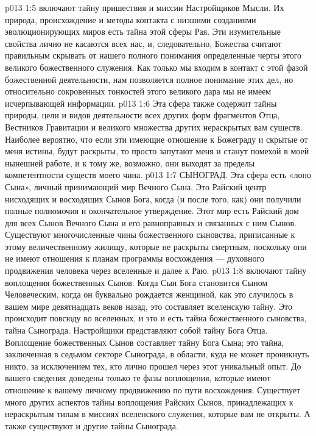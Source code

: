 \vs p013 1:5 \pc {} включают тайну пришествия и миссии Настройщиков Мысли. Их природа, происхождение и методы контакта с низшими созданиями эволюционирующих миров есть тайна этой сферы Рая. Эти изумительные свойства лично не касаются всех нас, и, следовательно, Божества считают правильным скрывать от нашего полного понимания определенные черты этого великого божественного служения. Как только мы входим в контакт с этой фазой божественной деятельности, нам позволяется полное понимание этих дел, но относительно сокровенных тонкостей этого великого дара мы не имеем исчерпывающей информации.
\vs p013 1:6 Эта сфера также содержит тайны природы, цели и видов деятельности всех других форм фрагментов Отца, Вестников Гравитации и великого множества других нераскрытых вам существ. Наиболее вероятно, что если эти имеющие отношение к Божеграду и скрытые от меня истины, будут раскрыты, то просто запутают меня и станут помехой в моей нынешней работе, и к тому же, возможно, они выходят за пределы компетентности существ моего чина.
\vs p013 1:7 \bibnobreakspace СЫНОГРАД. Эта сфера есть «лоно Сына», личный принимающий мир Вечного Сына. Это Райский центр нисходящих и восходящих Сынов Бога, когда (и после того, как) они получили полные полномочия и окончательное утверждение. Этот мир есть Райский дом для всех Сынов Вечного Сына и его равноправных и связанных с ним Сынов. Существуют многочисленные чины божественного сыновства, приписанные к этому величественному жилищу, которые не раскрыты смертным, поскольку они не имеют отношения к планам программы восхождения --- духовного продвижения человека через вселенные и далее к Раю.
\vs p013 1:8 \pc {} включают тайну воплощения божественных Сынов. Когда Сын Бога становится Сыном Человеческим, когда он буквально рождается женщиной, как это случилось в вашем мире девятнадцать веков назад, это составляет вселенскую тайну. Это происходит повсюду во вселенных, и это и есть тайна божественного сыновства, тайна Сынограда. Настройщики представляют собой тайну Бога Отца. Воплощение божественных Сынов составляет тайну Бога Сына; это тайна, заключенная в седьмом секторе Сынограда, в области, куда не может проникнуть никто, за исключением тех, кто лично прошел через этот уникальный опыт. До вашего сведения доведены только те фазы воплощения, которые имеют отношение к вашему личному продвижению по пути восхождения. Существует много других аспектов тайны воплощения Райских Сынов, принадлежащих к нераскрытым типам в миссиях вселенского служения, которые вам не открыты. А также существуют и другие тайны Сынограда.

